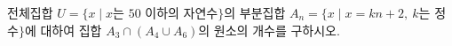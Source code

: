 전체집합 $U=\{x \mid x$는 $50$ 이하의 자연수$\}$의 부분집합 $A_n=\{x \mid x=kn+2,\ k$는 정수$\}$에 대하여 집합 $A_3\cap(A_4\cup A_6)$의 원소의 개수를 구하시오. 
